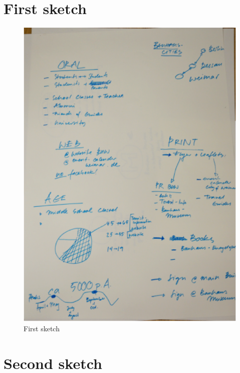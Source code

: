 \begin{appendices}
\section{First sketch}
\begin{figure}[H]
    \centering
    \includegraphics[width=\textwidth,height=0.8\textheight]{Appendices/4/sk1}%
    \caption{First sketch}%
    \label{app:Sk1}%
\end{figure}

\section{Second sketch}


\end{appendices}
